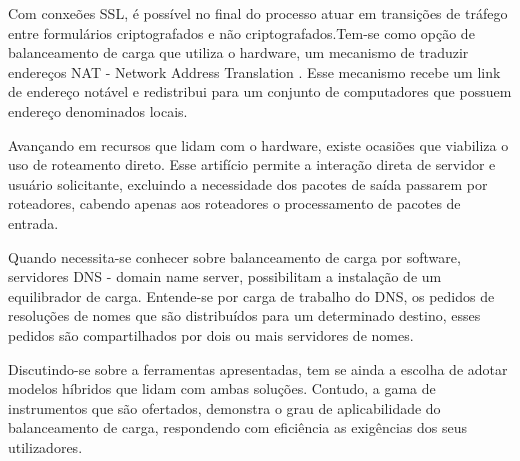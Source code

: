 Com conxeões SSL, é possível no final do processo atuar em transições de tráfego entre formulários criptografados e 
não criptografados.Tem-se como opção de balanceamento de carga que utiliza
o hardware, um mecanismo de traduzir endereços NAT - Network Address Translation . Esse mecanismo recebe um link de 
endereço notável e redistribui para um conjunto de computadores que possuem endereço denominados locais.


Avançando em recursos que lidam com o hardware, existe ocasiões que viabiliza o uso de roteamento direto. Esse artifício
permite a interação direta de servidor e usuário solicitante, excluindo a necessidade dos pacotes de saída passarem por
roteadores, cabendo apenas aos roteadores o processamento de pacotes de entrada.


Quando necessita-se conhecer sobre balanceamento de carga por software, servidores DNS - domain name server, possibilitam
a instalação de um equilibrador de carga. Entende-se por carga de trabalho do DNS, os pedidos de resoluções de nomes que 
são distribuídos para um determinado destino, esses pedidos são compartilhados por dois ou mais servidores de nomes.


Discutindo-se sobre a ferramentas apresentadas, tem se ainda a escolha de adotar modelos híbridos que lidam com ambas
soluções. Contudo, a gama de instrumentos que são ofertados,  demonstra o grau de aplicabilidade do balanceamento de 
carga, respondendo com eficiência as exigências dos seus utilizadores. 

